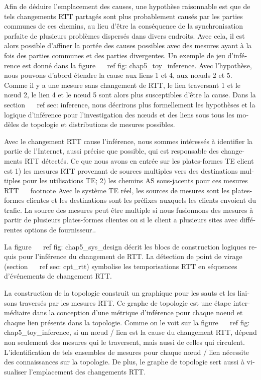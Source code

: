 \begin{otherlanguage}{french}
{{Afin de déduire l'emplacement des causes, une hypothèse raisonnable est que de tels changements RTT partagés sont plus probablement causés par les parties communes de ces chemins, au lieu d'être la conséquence de la synchronisation parfaite de plusieurs problèmes dispersés dans divers endroits.
Avec cela, il est alors possible d'affiner la portée des causes possibles avec des mesures ayant à la fois des parties communes et des parties divergentes.
Un exemple de jeu d'inférence est donné dans la figure ~ \ ref {fig: chap5_toy_inference}.
Avec l'hypothèse, nous pouvons d'abord étendre la cause aux liens 1 et 4, aux nœuds 2 et 5.
Comme il y a une mesure sans changement de RTT, le lien traversant 1 et le nœud 2, le lien 4 et le nœud 5 sont alors plus susceptibles d'être la cause.
Dans la section ~ \ ref {sec: inference}, nous décrirons plus formellement les hypothèses et la logique d'inférence pour l'investigation des nœuds et des liens sous tous les modèles de topologie et distributions de mesures possibles.

Avec le changement RTT cause l'inférence, nous sommes intéressés à identifier la partie de l'Internet, aussi précise que possible, qui est responsable des changements RTT détectés.
Ce que nous avons en entrée sur les plates-formes TE client est 1) les mesures RTT provenant de sources multiples vers des destinations multiples pour les utilisations TE; 2) les chemins AS sous-jacents pour ces mesures RTT ~ \ footnote {Avec le système TE réel, les sources de mesures sont les plates-formes clientes et les destinations sont les préfixes auxquels les clients envoient du trafic.
La source des mesures peut être multiple si nous fusionnons des mesures à partir de plusieurs plates-formes clientes ou si le client a plusieurs sites avec différentes options de fournisseur.}.

La figure ~ \ ref {fig: chap5_sys_design} décrit les blocs de construction logiques requis pour l'inférence du changement de RTT. La détection de point de virage (section ~ \ ref {sec: cpt_rtt}) symbolise les temporisations RTT en séquences d'événements de changement RTT.

La construction de la topologie construit un graphique pour les sauts et les liaisons traversés par les mesures RTT.
Ce graphe de topologie est une étape intermédiaire dans la conception d'une métrique d'inférence pour chaque noeud et chaque lien présents dans la topologie. Comme on le voit sur la figure ~ \ ref {fig: chap5_toy_inference}, si un nœud / lien est la cause du changement RTT, dépend non seulement des mesures qui le traversent, mais aussi de celles qui circulent. L'identification de tels ensembles de mesures pour chaque nœud / lien nécessite des connaissances sur la topologie. De plus, le graphe de topologie sert aussi à visualiser l'emplacement des changements RTT.

}}
\end{otherlanguage}
